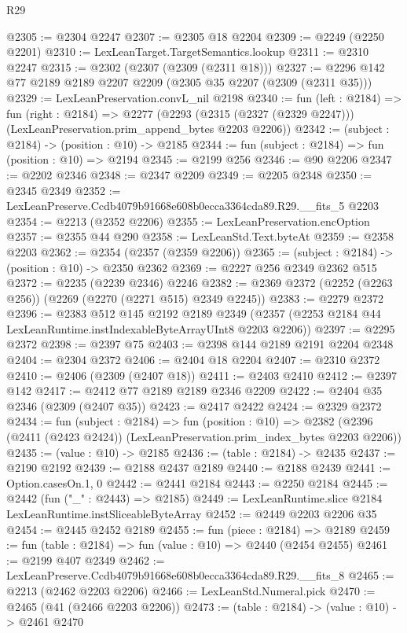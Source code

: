 \begin{lexlean}{R29}
\begin{coremodule}
@2305 := @2304 @2247
@2307 := @2305 @18 @2204
@2309 := @2249 (@2250 @2201)
@2310 := LexLeanTarget.TargetSemantics.lookup
@2311 := @2310 @2247
@2315 := @2302 (@2307 (@2309 (@2311 @18)))
@2327 := @2296 @142 @77 @2189 @2189 @2207 @2209 (@2305 @35 @2207 (@2309 (@2311 @35)))
@2329 := LexLeanPreservation.convL_nil @2198
@2340 := fun (left : @2184) =>
  fun (right : @2184) =>
  @2277 (@2293 (@2315 (@2327 (@2329 @2247))) (LexLeanPreservation.prim_append_bytes @2203 @2206))
@2342 := (subject : @2184) -> (position : @10) -> @2185
@2344 := fun (subject : @2184) => fun (position : @10) => @2194
@2345 := @2199 @256
@2346 := @90 @2206
@2347 := @2202 @2346
@2348 := @2347 @2209
@2349 := @2205 @2348
@2350 := @2345 @2349
@2352 := LexLeanPreserve.Ccdb4079b91668e608b0ecca3364cda89.R29.__fits_5 @2203
@2354 := @2213 (@2352 @2206)
@2355 := LexLeanPreservation.encOption
@2357 := @2355 @44 @290
@2358 := LexLeanStd.Text.byteAt
@2359 := @2358 @2203
@2362 := @2354 (@2357 (@2359 @2206))
@2365 := (subject : @2184) -> (position : @10) -> @2350 @2362
@2369 := @2227 @256 @2349 @2362 @515
@2372 := @2235 (@2239 @2346) @2246
@2382 := @2369 @2372 (@2252 (@2263 @256)) (@2269 (@2270 (@2271 @515) @2349 @2245))
@2383 := @2279 @2372
@2396 := @2383
    @512
    @145
    @2192
    @2189
    @2349
    (@2357 (@2253 @2184 @44 LexLeanRuntime.instIndexableByteArrayUInt8 @2203 @2206))
@2397 := @2295 @2372
@2398 := @2397 @75
@2403 := @2398 @144 @2189 @2191 @2204 @2348
@2404 := @2304 @2372
@2406 := @2404 @18 @2204
@2407 := @2310 @2372
@2410 := @2406 (@2309 (@2407 @18))
@2411 := @2403 @2410
@2412 := @2397 @142
@2417 := @2412 @77 @2189 @2189 @2346 @2209
@2422 := @2404 @35 @2346 (@2309 (@2407 @35))
@2423 := @2417 @2422
@2424 := @2329 @2372
@2434 := fun (subject : @2184) =>
  fun (position : @10) =>
  @2382 (@2396 (@2411 (@2423 @2424)) (LexLeanPreservation.prim_index_bytes @2203 @2206))
@2435 := (value : @10) -> @2185
@2436 := (table : @2184) -> @2435
@2437 := @2190 @2192
@2439 := @2188 @2437 @2189
@2440 := @2188 @2439
@2441 := Option.casesOn.{1, 0}
@2442 := @2441 @2184
@2443 := @2250 @2184
@2445 := @2442 (fun ("_" : @2443) => @2185)
@2449 := LexLeanRuntime.slice @2184 LexLeanRuntime.instSliceableByteArray
@2452 := @2449 @2203 @2206 @35
@2454 := @2445 @2452 @2189
@2455 := fun (piece : @2184) => @2189
@2459 := fun (table : @2184) => fun (value : @10) => @2440 (@2454 @2455)
@2461 := @2199 @407 @2349
@2462 := LexLeanPreserve.Ccdb4079b91668e608b0ecca3364cda89.R29.__fits_8
@2465 := @2213 (@2462 @2203 @2206)
@2466 := LexLeanStd.Numeral.pick
@2470 := @2465 (@41 (@2466 @2203 @2206))
@2473 := (table : @2184) -> (value : @10) -> @2461 @2470

\end{coremodule}
\end{lexlean}
